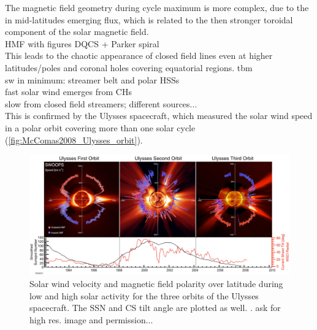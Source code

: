 The magnetic field geometry during cycle maximum is more complex, due to the in mid-latitudes emerging flux, which is related to the then stronger toroidal component of the solar magnetic field.\\

HMF with figures DQCS + Parker spiral\\

This leads to the chaotic appearance of closed field lines even at higher latitudes/poles and coronal holes covering equatorial regions. tbm\\

sw in minimum: streamer belt and polar HSSs\\

fast solar wind emerges from CHs\\

slow from closed field streamers; different sources...\\

This is confirmed by the Ulysses spacecraft, which measured the solar wind speed in a polar orbit covering more than one solar cycle (\autoref{fig:McComas2008_Ulysses_orbit}).\\
\begin{figure}[htb]
	\centering
	\includegraphics[width=\textwidth]{images/McComas2008_Ulysses_orbit_.png}
	\caption{Solar wind velocity and magnetic field polarity over latitude during low and high solar activity for the three orbits of the Ulysses spacecraft. The SSN and CS tilt angle are plotted as well. \citep[Fig.~1]{McComas200809}. ask for high res. image and permission...}
	\label{fig:McComas2008_Ulysses_orbit}
\end{figure}

